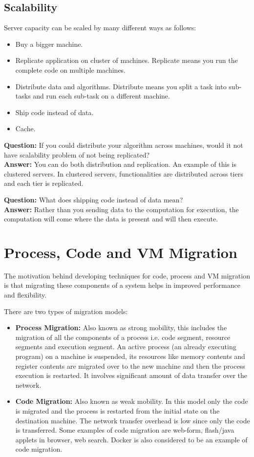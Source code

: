 \documentclass[twoside]{article}
\begin{document}
\subsection{Scalability}
Server capacity can be scaled by many different ways as follows:
\begin{itemize}
    \item Buy a bigger machine.
    \item Replicate application on cluster of machines. Replicate means you run the complete code on multiple machines.
    \item Distribute data and algorithms. Distribute means you split a task into sub-tasks and run each sub-task on a different machine.
    \item Ship code instead of data.
    \item Cache.
\end{itemize}

\textbf{Question:} If you could distribute your algorithm across machines, would it not have scalability problem of not being replicated?
\\ \textbf{Answer:} You can do both distribution and replication. An example of this is clustered servers. In clustered servers, functionalities are distributed across tiers and each tier is replicated.

\textbf{Question:} What does shipping code instead of data mean?
\\ \textbf{Answer:} Rather than you sending data to the computation for execution, the computation will come where the data is present and will then execute.

\section{Process, Code and VM Migration}
The motivation behind developing techniques for code, process and VM migration is that migrating these components of a system helps in improved performance and flexibility.

There are two types of migration models:
\begin{itemize}
    \item \textbf{Process Migration:} Also known as strong mobility, this includes the migration of all the components of a process i.e. code segment, resource segments and execution segment. An active process (an already executing program) on a machine is suspended, its resources like memory contents and register contents are migrated over to the new machine and then the process execution is restarted. It involves significant amount of data transfer over the network.
    \item \textbf{Code Migration:} Also known as weak mobility. In this model only the code is migrated and the process is restarted from the initial state on the destination machine. The network transfer overhead is low since only the code is transferred. Some examples of code migration are web-form, flash/java applets in browser, web search. Docker is also considered to be an example of code migration. 
\end{itemize}
\end{document}
